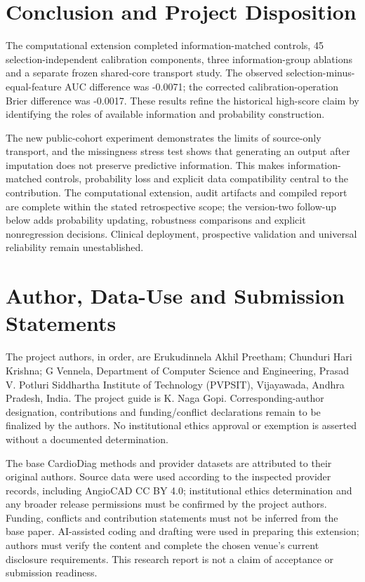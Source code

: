 \documentclass[conference]{IEEEtran}
\begin{document}
\section{Conclusion and Project Disposition}
The computational extension completed information-matched controls, 45 selection-independent calibration components, three information-group ablations and a separate frozen shared-core transport study. The observed selection-minus-equal-feature AUC difference was -0.0071; the corrected calibration-operation Brier difference was -0.0017. These results refine the historical high-score claim by identifying the roles of available information and probability construction.

The new public-cohort experiment demonstrates the limits of source-only transport, and the missingness stress test shows that generating an output after imputation does not preserve predictive information. This makes information-matched controls, probability loss and explicit data compatibility central to the contribution. The computational extension, audit artifacts and compiled report are complete within the stated retrospective scope; the version-two follow-up below adds probability updating, robustness comparisons and explicit nonregression decisions. Clinical deployment, prospective validation and universal reliability remain unestablished.

\section*{Author, Data-Use and Submission Statements}
The project authors, in order, are Erukudinnela Akhil Preetham; Chunduri Hari Krishna; G Vennela, Department of Computer Science and Engineering, Prasad V. Potluri Siddhartha Institute of Technology (PVPSIT), Vijayawada, Andhra Pradesh, India. The project guide is K. Naga Gopi. Corresponding-author designation, contributions and funding/conflict declarations remain to be finalized by the authors. No institutional ethics approval or exemption is asserted without a documented determination.

The base CardioDiag methods and provider datasets are attributed to their original authors. Source data were used according to the inspected provider records, including AngioCAD CC BY 4.0; institutional ethics determination and any broader release permissions must be confirmed by the project authors. Funding, conflicts and contribution statements must not be inferred from the base paper. AI-assisted coding and drafting were used in preparing this extension; authors must verify the content and complete the chosen venue's current disclosure requirements. This research report is not a claim of acceptance or submission readiness.
\end{document}
